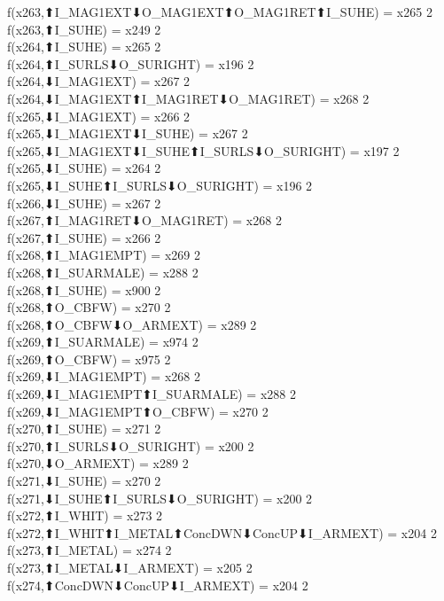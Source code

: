 f(x263,⬆I_MAG1EXT⬇O_MAG1EXT⬆O_MAG1RET⬆I_SUHE) = x265 {2} \\
f(x263,⬆I_SUHE) = x249 {2} \\
f(x264,⬆I_SUHE) = x265 {2} \\
f(x264,⬆I_SURLS⬇O_SURIGHT) = x196 {2} \\
f(x264,⬇I_MAG1EXT) = x267 {2} \\
f(x264,⬇I_MAG1EXT⬆I_MAG1RET⬇O_MAG1RET) = x268 {2} \\
f(x265,⬇I_MAG1EXT) = x266 {2} \\
f(x265,⬇I_MAG1EXT⬇I_SUHE) = x267 {2} \\
f(x265,⬇I_MAG1EXT⬇I_SUHE⬆I_SURLS⬇O_SURIGHT) = x197 {2} \\
f(x265,⬇I_SUHE) = x264 {2} \\
f(x265,⬇I_SUHE⬆I_SURLS⬇O_SURIGHT) = x196 {2} \\
f(x266,⬇I_SUHE) = x267 {2} \\
f(x267,⬆I_MAG1RET⬇O_MAG1RET) = x268 {2} \\
f(x267,⬆I_SUHE) = x266 {2} \\
f(x268,⬆I_MAG1EMPT) = x269 {2} \\
f(x268,⬆I_SUARMALE) = x288 {2} \\
f(x268,⬆I_SUHE) = x900 {2} \\
f(x268,⬆O_CBFW) = x270 {2} \\
f(x268,⬆O_CBFW⬇O_ARMEXT) = x289 {2} \\
f(x269,⬆I_SUARMALE) = x974 {2} \\
f(x269,⬆O_CBFW) = x975 {2} \\
f(x269,⬇I_MAG1EMPT) = x268 {2} \\
f(x269,⬇I_MAG1EMPT⬆I_SUARMALE) = x288 {2} \\
f(x269,⬇I_MAG1EMPT⬆O_CBFW) = x270 {2} \\
f(x270,⬆I_SUHE) = x271 {2} \\
f(x270,⬆I_SURLS⬇O_SURIGHT) = x200 {2} \\
f(x270,⬇O_ARMEXT) = x289 {2} \\
f(x271,⬇I_SUHE) = x270 {2} \\
f(x271,⬇I_SUHE⬆I_SURLS⬇O_SURIGHT) = x200 {2} \\
f(x272,⬆I_WHIT) = x273 {2} \\
f(x272,⬆I_WHIT⬆I_METAL⬆ConcDWN⬇ConcUP⬇I_ARMEXT) = x204 {2} \\
f(x273,⬆I_METAL) = x274 {2} \\
f(x273,⬆I_METAL⬇I_ARMEXT) = x205 {2} \\
f(x274,⬆ConcDWN⬇ConcUP⬇I_ARMEXT) = x204 {2} \\
